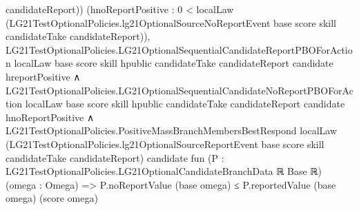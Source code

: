 \documentclass[10pt]{article}
\begin{document}
\begin{ReviewVerbatim}
                            candidateReport))
                      (hnoReportPositive :
                      0 <
                        localLaw
                          (LG21TestOptionalPolicies.lg21OptionalSourceNoReportEvent base score skill candidateTake
                            candidateReport)),
                      LG21TestOptionalPolicies.LG21OptionalSequentialCandidateReportPBOForAction localLaw base score
                          skill hpublic candidateTake candidateReport candidate hreportPositive ∧
                        LG21TestOptionalPolicies.LG21OptionalSequentialCandidateNoReportPBOForAction localLaw base score
                            skill hpublic candidateTake candidateReport candidate hnoReportPositive ∧
                          LG21TestOptionalPolicies.PositiveMassBranchMembersBestRespond localLaw
                            (LG21TestOptionalPolicies.lg21OptionalSourceReportEvent base score skill candidateTake
                              candidateReport)
                            candidate
                            fun (P : LG21TestOptionalPolicies.LG21OptionalCandidateBranchData ℝ Base ℝ)
                              (omega : Omega) =>
                            P.noReportValue (base omega) ≤ P.reportedValue (base omega) (score omega)
\end{ReviewVerbatim}
\end{document}

